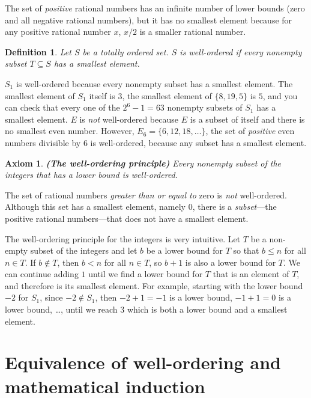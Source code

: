 \documentclass[11pt,a4paper]{report}
\newtheorem{definition}[theorem]{Definition}
\newtheorem{axiom}{Axiom}
\begin{document}
The set of \emph{positive} rational numbers has an infinite number of lower bounds (zero and all negative rational numbers), but it has no smallest element because for any positive rational number $x$, $x/2$ is a smaller rational number.

\begin{definition} Let $S$ be a totally ordered set. $S$ is \emph{well-ordered} if \emph{every} nonempty subset $T\subseteq S$ has a smallest element.
\end{definition}

$S_1$ is well-ordered because every nonempty subset has a smallest element. The smallest element of $S_1$ itself is $3$, the smallest element of $\{8, 19, 5\}$ is $5$, and you can check that every one of the $2^6-1=63$ nonempty subsets of $S_1$ has a smallest element. $E$ is \emph{not} well-ordered because $E$ is a subset of itself and there is no smallest even number. However, $E_6=\{6,12,18,\ldots\}$, the set of \emph{positive} even numbers divisible by $6$ is well-ordered, because any subset has a smallest element.

\begin{axiom} \textbf{(The well-ordering principle)} Every nonempty subset of the integers that has a lower bound is well-ordered.
\end{axiom}

The set of rational numbers \emph{greater than or equal to} zero is \emph{not} well-ordered. Although this set has a smallest element, namely $0$, there is a \emph{subset}---the positive rational numbers---that does not have a smallest element.

The well-ordering principle for the integers is very intuitive. Let $T$ be a non-empty subset of the integers and let $b$ be a lower bound for $T$ so that $b\leq n$ for all $n\in T$. If $b\not\in T$, then $b<n$ for all $n\in T$, so $b+1$ is also a lower bound for $T$. We can continue adding $1$ until we find a lower bound for $T$ that is an element of $T$, and therefore is its smallest element. For example, starting with the lower bound $-2$ for $S_1$, since $-2\not\in S_1$, then $-2+1=-1$ is a lower bound, $-1+1=0$ is a lower bound, \ldots, until we reach $3$ which is both a lower bound and a smallest element.

\section{Equivalence of well-ordering and mathematical induction}
\end{document}
